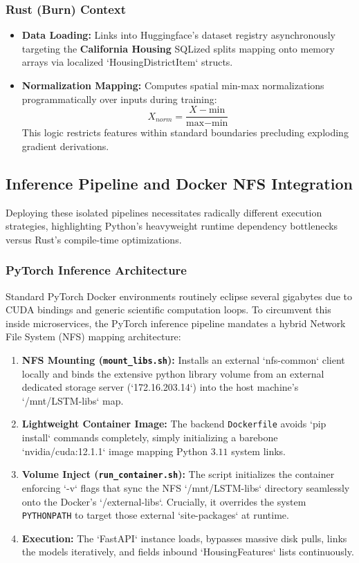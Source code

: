 \documentclass[10pt,a4paper,twocolumn]{article}
\begin{document}
\subsubsection{Rust (Burn) Context}
\begin{itemize}
    \item \textbf{Data Loading:} Links into Huggingface's dataset registry asynchronously targeting the \textbf{California Housing} SQLized splits mapping onto memory arrays via localized `HousingDistrictItem` structs.
    \item \textbf{Normalization Mapping:} Computes spatial min-max normalizations programmatically over inputs during training:
    \[ X_{norm} = \frac{X - \text{min}}{\text{max} - \text{min}} \]
    This logic restricts features within standard boundaries precluding exploding gradient derivations.
\end{itemize}

\subsection{Inference Pipeline and Docker NFS Integration}

Deploying these isolated pipelines necessitates radically different execution strategies, highlighting Python's heavyweight runtime dependency bottlenecks versus Rust's compile-time optimizations.

\subsubsection{PyTorch Inference Architecture}
Standard PyTorch Docker environments routinely eclipse several gigabytes due to CUDA bindings and generic scientific computation loops. To circumvent this inside microservices, the PyTorch inference pipeline mandates a hybrid Network File System (NFS) mapping architecture:
\begin{enumerate}
    \item \textbf{NFS Mounting (\texttt{mount\_libs.sh}):} Installs an external `nfs-common` client locally and binds the extensive python library volume from an external dedicated storage server (`172.16.203.14`) into the host machine's `/mnt/LSTM-libs` map.
    \item \textbf{Lightweight Container Image:} The backend \texttt{Dockerfile} avoids `pip install` commands completely, simply initializing a barebone `nvidia/cuda:12.1.1` image mapping Python $3.11$ system links. 
    \item \textbf{Volume Inject (\texttt{run\_container.sh}):} The script initializes the container enforcing `-v` flags that sync the NFS `/mnt/LSTM-libs` directory seamlessly onto the Docker's `/external-libs`. Crucially, it overrides the system \texttt{PYTHONPATH} to target those external `site-packages` at runtime.
    \item \textbf{Execution:} The `FastAPI` instance loads, bypasses massive disk pulls, links the models iteratively, and fields inbound `HousingFeatures` lists continuously.
\end{enumerate}
\end{document}
